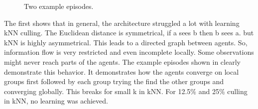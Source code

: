 \begin{figure}[htp]
    \centering
    \hspace{1cm}                       
    \caption{Two example episodes.}
    \label{fig:observation-examples}
\end{figure}

The first  shows that in general, the architecture struggled a lot with learning kNN culling. The Euclidean distance is symmetrical, if a sees b then b sees a. but kNN is highly asymmetrical. This leads to a directed graph between agents. So, information flow is very restricted and even incomplete locally. Some observations might never reach parts of the agents. The example episodes shown in  clearly demonstrate this behavior. It demonstrates how the agents converge on local groups first followed by each group trying the find the other groups and converging globally. This breaks for small k in kNN. For 12.5$\%$ and 25$\%$ culling in kNN, no learning was achieved.


